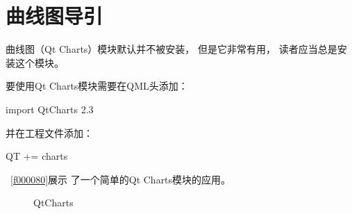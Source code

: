 ﻿




\FloatBarrier
\section{
曲线图导引
}\label{c000017s01}


曲线图（Qt Charts）模块默认并不被安装，
但是它非常有用，
读者应当总是安装这个模块。

要使用Qt Charts模块需要在QML头添加：\begin{littlelongworld}
import QtCharts 2.3
\end{littlelongworld}
并在工程文件添加：\begin{littlelongworld}
QT {\sourcefonttwo{}+}{\sourcefonttwo{}=} charts
\end{littlelongworld}
\hspace*{\parindent}\filesourcenumbernameone\ \ref{f000080}展示
了一个简单的Qt Charts模块的应用。

\begin{figure}[htb] %
\marginnote{\setlength\fboxsep{2pt}\fbox{\footnotesize{\kaishu\figurename\,}\footnotesize{\ref{p000049}}}}\centering %
\setlength\fboxsep{0pt} %
\caption{QtCharts} %
\label{p000049} %
\end{figure}



